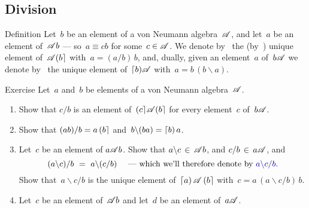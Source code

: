 \documentclass[a]{subfiles}
\begin{document}
\subsection{Division}
\begin{parsec}%
\begin{point}[division]{Definition}%
Let~$b$ be an element of a von Neumann algebra~$\mathscr{A}$,
and let~$a$ be an element of~$\mathscr{A} b$
--- so~$a\equiv cb$ for some~$c\in\mathscr{A}$.
We denote by~ 
the (by~) unique
element of~$\mathscr{A}\!\left(b\right\rceil$
with~$a=(a/b)\, b$,
and, dually,
given an element~$a$ of~$b\mathscr{A}$ 
we denote by~ 
the unique
element of~$\left\lceil b\right)\!\mathscr{A}$
with~$a=b\,(b\backslash a)$.
\end{point}
\begin{point}{Exercise}%
Let~$a$ and~$b$
be elements of a von Neumann algebra~$\mathscr{A}$.
\begin{enumerate}
\item
Show that $c/b$ is an element of~$\left(c\right\rceil\!\mathscr{A}\!\left(b\right\rceil$
for every element~$c$ of~$b\mathscr{A}$.
\item
Show that $(ab)/b = a\left(b\right\rceil$
and~$b\backslash (ba)=\left\lceil b\right)a$.
\item
Let~$c$ be an element of $a\mathscr{A} b$.
Show that
$a \backslash c \,\in\, \mathscr{A} b$,
and
$c/b\,\in\,a\mathscr{A}$, and
\begin{equation*}
(a\backslash c)/b\ =\  a\backslash(c/b)
\quad \text{ --- which we'll therefore denote by}\  \Define{a\backslash c/b}.
\end{equation*}
Show that~$a\backslash c/b$
is the unique element of~$\left\lceil a\right)\mathscr{A}\left(b\right\rceil$
with~$c=a\,(a\backslash c / b)\, b$. 
\item
Let~$c$ be an element of~$\mathscr{A} b$
and let~$d$ be an element of~$a\mathscr{A}$.


\end{enumerate}
\end{point}
\end{parsec}
\end{document}

